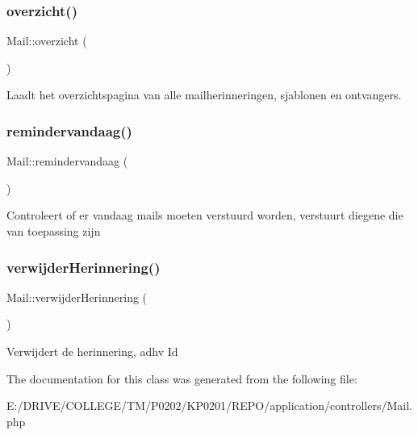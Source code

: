 \subsubsection{\texorpdfstring{overzicht()}{overzicht()}}
{\footnotesize\ttfamily Mail\+::overzicht (\begin{DoxyParamCaption}{ }\end{DoxyParamCaption})}

Laadt het overzichtspagina van alle mailherinneringen, sjablonen en ontvangers. \mbox{\label{class_mail_a6b0bf7c864a3999c5b56222deb88874f}} 
\subsubsection{\texorpdfstring{remindervandaag()}{remindervandaag()}}
{\footnotesize\ttfamily Mail\+::remindervandaag (\begin{DoxyParamCaption}{ }\end{DoxyParamCaption})}

Controleert of er vandaag mails moeten verstuurd worden, verstuurt diegene die van toepassing zijn \mbox{\label{class_mail_a5870a82a870b3b579d503101494abaf9}} 
\subsubsection{\texorpdfstring{verwijder\+Herinnering()}{verwijderHerinnering()}}
{\footnotesize\ttfamily Mail\+::verwijder\+Herinnering (\begin{DoxyParamCaption}{ }\end{DoxyParamCaption})}

Verwijdert de herinnering, adhv Id 

The documentation for this class was generated from the following file\+:\begin{DoxyCompactItemize}
\item 
E\+:/\+D\+R\+I\+V\+E/\+C\+O\+L\+L\+E\+G\+E/\+T\+M/\+P0202/\+K\+P0201/\+R\+E\+P\+O/application/controllers/Mail.\+php\end{DoxyCompactItemize}
